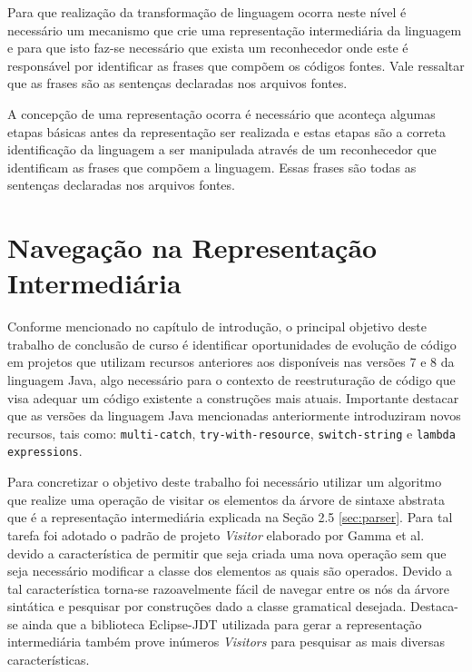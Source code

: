 Para que realização da transformação de linguagem ocorra neste nível é necessário um mecanismo que crie uma representação intermediária da linguagem e para que isto faz-se necessário que exista um reconhecedor onde este é responsável por identificar as frases que compõem os códigos fontes. Vale ressaltar que as frases são as sentenças declaradas nos arquivos fontes.

A concepção de uma representação ocorra é necessário que aconteça algumas etapas básicas antes da representação ser realizada e estas etapas são a correta identificação da linguagem a ser manipulada através de um reconhecedor que identificam as frases que compõem a linguagem. Essas frases são todas as sentenças declaradas nos arquivos fontes.


\section{Navegação na Representação Intermediária}\label{sec:visitor}
Conforme mencionado no capítulo de introdução, o principal objetivo deste trabalho de conclusão de curso é identificar oportunidades de evolução de código  em projetos que utilizam recursos anteriores aos disponíveis nas versões 7 e 8 da linguagem Java, algo necessário para o contexto de reestruturação de código que visa adequar um código existente a construções mais atuais. Importante destacar que as versões da linguagem Java mencionadas anteriormente introduziram novos recursos, tais como: \texttt{multi-catch}, \texttt{try-with-resource}, \texttt{switch-string} e \texttt{lambda expressions}.


Para concretizar o objetivo deste trabalho foi necessário utilizar um algoritmo que realize uma operação de visitar os elementos da árvore de sintaxe abstrata que é a representação intermediária explicada na Seção 2.5 \ref{sec:parser}. Para tal tarefa foi adotado o padrão de projeto \textit{Visitor} elaborado por Gamma et al.~\cite{Gamma:1995} devido a característica de permitir que seja criada uma nova operação sem que seja necessário modificar a classe dos elementos as quais são operados. Devido a tal característica torna-se razoavelmente fácil de navegar entre os nós da árvore sintática e pesquisar por construções dado a classe gramatical desejada. Destaca-se ainda que a biblioteca Eclipse-JDT utilizada para gerar a representação intermediária também prove inúmeros \textit{Visitors} para pesquisar as mais diversas características.


